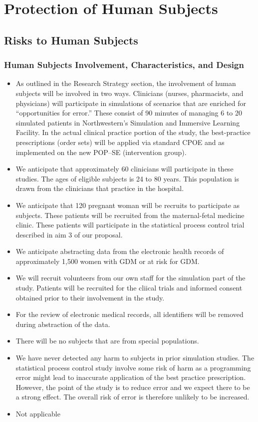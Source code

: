 \documentclass{article}
\begin{document}
\section{Protection of Human Subjects}
\subsection{Risks to Human Subjects}
\subsubsection{Human Subjects Involvement, Characteristics, and Design}
\begin{itemize}
\item	As outlined in the Research Strategy section, the involvement of human subjects will be involved in two ways. Clinicians (nurses, pharmacists, and physicians) will participate in simulations of scenarios that are enriched for “opportunities for error.” These consist of 90 minutes of managing 6 to 20 simulated patients in Northwestern’s Simulation and Immersive Learning Facility.  In the actual clinical practice portion of the study, the best-practice prescriptions (order sets) will be applied via standard CPOE and as implemented on the new POP–SE (intervention group). 
\item We anticipate that approximately 60 clinicians will participate in these studies. The ages of eligible subjects is 24 to 80 years. This population is drawn from the clinicians that practice in the hospital. 
\item We anticipate that 120 pregnant woman will be recruits to participate as subjects. These patients will be recruited from the maternal-fetal medicine clinic. These patients will participate in the statistical process control trial described in aim 3 of our proposal.
\item We anticipate abstracting data from the electronic health records of approximately 1,500 women with GDM or at risk for GDM.
\item We will recruit volunteers from our own staff for the simulation part of the study. Patients will be recruited for the cliical trials and informed consent obtained prior to their involvement in the study.
\item For the review of electronic medical records, all identifiers will be removed during abstraction of the data.
\item There will be no subjects that are from special populations.
\item We have never detected any harm to subjects in prior simulation studies. The statistical process control study involve some risk of harm as a programming error might lead to inaccurate application of the best practice prescription. However, the point of the study is to reduce error and we expect there to be a strong effect. The overall risk of error is therefore unlikely to be increased.
\item Not applicable
\end{itemize}
\end{document}

